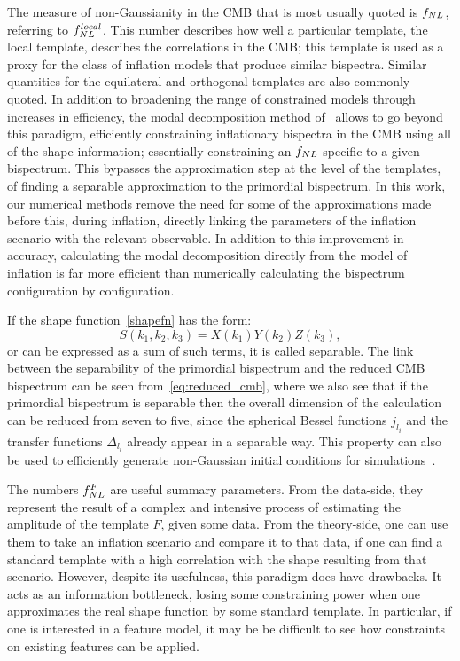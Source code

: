 The measure of non-Gaussianity in the CMB that is
most usually quoted is $f_{NL}$, referring to $f^{local}_{NL}$.
This number describes how well a particular template, the local template,
describes the correlations in the CMB;
this template is used as a proxy for the class of inflation models that produce similar bispectra.
Similar quantities for the equilateral and orthogonal templates are also
commonly quoted.
In addition to broadening the range of constrained models through increases in efficiency,
the modal decomposition method of~\cite{FergShell_1,FergShell_2,FergShell_3}
allows to go beyond this paradigm, efficiently constraining inflationary bispectra in the CMB using
all of the shape information; essentially constraining an $f_{NL}$
specific to a given bispectrum. This bypasses the approximation step at the level of the templates,
of finding a separable approximation to the primordial bispectrum.
In this work, our numerical methods remove the need for some of the approximations
made before this, during inflation, directly linking the parameters of the inflation scenario
with the relevant observable.
In addition to this improvement in accuracy, calculating the modal decomposition
directly from the model of inflation is far more efficient 
than numerically calculating the bispectrum configuration by configuration.


If the shape function~\eqref{shapefn} has the form:
\begin{equation}\label{sepXYZ}
S(k_1,k_2,k_3) = X(k_1)Y(k_2)Z(k_3),
\end{equation}
or can be expressed as a sum of such terms,
it is called separable.
The link between the separability of the primordial bispectrum
and the reduced CMB bispectrum can be seen from~\eqref{eq:reduced_cmb},
where we also see that if the primordial bispectrum is separable
then the overall dimension
of the calculation can be reduced from seven to five, 
since the spherical Bessel functions $j_{l_i}$ and the
transfer functions $\Delta_{l_i}$ already appear in a separable way.
This property can also be used to
efficiently generate non-Gaussian initial conditions
for simulations~\cite{Scoccimarro_2012}.


The numbers $f_{NL}^F$ are useful summary parameters.
From the data-side, they represent the result of
a complex and intensive process
of estimating the amplitude of the template $F$,
given some data. From the theory-side, one
can use them to take an inflation scenario and compare it
to that data, if one can find a standard template
with a high correlation with the shape resulting
from that scenario.
However, despite its usefulness, this paradigm does
have drawbacks. It acts as an information bottleneck,
losing some constraining power when one approximates
the real shape function by some standard template.
In particular, if one is interested in a feature model,
it may be be difficult to see how constraints on existing
features can be applied.
